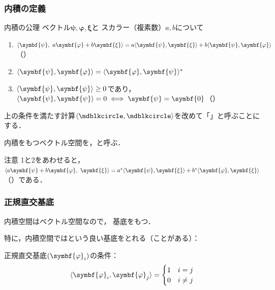\documentclass[
    10pt,
    ]{sotsu-beamer}
\begin{document}
\begin{frame}[label={frame:definition-of-inner-product}]
    \frametitle{内積の定義}


    \begin{block}{内積の公理}
        ベクトル$\symbf{\psi}, \symbf{\varphi}, \symbf{\xi}$と
        スカラー（複素数）$a, b$について
        \begin{enumerate}
            \item $\iparen{\symbf{\psi}, \  a\symbf{\varphi} + b\symbf{\xi}} = a\iparen{\symbf{\psi}, \symbf{\xi}} + b\iparen{\symbf{\psi}, \symbf{\varphi}}$（）
            \item $\iparen{\symbf{\psi}, \symbf{\varphi}} = \conj{\iparen{\symbf{\varphi}, \symbf{\psi}}}$
            \item $\iparen{\symbf{\psi}, \symbf{\psi}} \geq 0$であり，
                $\iparen{\symbf{\psi}, \symbf{\psi}} = 0 \iff \symbf{\psi} = \symbf{0}$（）
        \end{enumerate}
    \end{block}

    \pause

    上の条件を満たす計算$\iparen{\bigdot, \bigdot}$を改めて「」と呼ぶことにする．

    内積をもつベクトル空間を，と呼ぶ．

    \pause

    \begin{alertblock}{注意}
        1と2をあわせると，
        $\iparen{a\symbf{\psi} + b\symbf{\varphi}, \  \symbf{\xi}} = \conj{a}\iparen{\symbf{\psi}, \symbf{\xi}} + \conj{b}\iparen{\symbf{\varphi}, \symbf{\xi}}$（）である．
    \end{alertblock}


\end{frame}


\begin{frame}
    \frametitle{正規直交基底}

    内積空間はベクトル空間なので，
    基底をもつ．

    特に，内積空間ではという良い基底をとれる（ことがある）：

    正規直交基底$\sequ{\symbf{\varphi}_i}$の条件：
    \begin{equation*}
        \iparen{ \symbf{\varphi}_i, \symbf{\varphi}_j }
        = \begin{cases}
            1  &  i = j  \\
            0  &  i \neq j  
        \end{cases}
    \end{equation*}

\end{frame}
\end{document}
